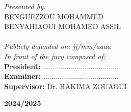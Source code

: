 \begin{spacing}{1.5}
  \noindent
  \textit{Presented by:} \\
  BENGUEZZOU MOHAMMED \\
  BENYAHIAOUI MOHAMED ASSIL\\
  ~~\\
  \textit{Publicly defended on: jj/mm/aaaa} \\
  \textit{In front of the jury composed of:} \\
  \textbf{President:} ...................................... \\
  \textbf{Examiner:} ...................................... \\
  \textbf{Supervisor:} Dr. HAKIMA ZOUAOUI \\
  \centerline{\textbf{2024/2025}}

\end{spacing}



